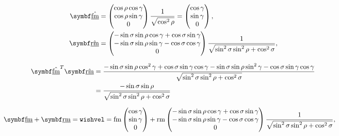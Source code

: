 \begin{align*}
\uvec{\flat{\fmove}} &=
\begin{pmatrix}
	\cos\rho\cos\gamma\\
	\cos\rho\sin\gamma\\
	0
\end{pmatrix} \frac{1}{\sqrt{\cos^2\rho}} =
\begin{pmatrix}
	\cos\gamma\\
	\sin\gamma\\
	0
\end{pmatrix},\\
\uvec{\flat{\rmove}} &=
\begin{pmatrix}
	-\sin\sigma\sin\rho\cos\gamma + \cos\sigma\sin\gamma\\
	-\sin\sigma\sin\rho\sin\gamma - \cos\sigma\cos\gamma\\
	0
\end{pmatrix} \frac{1}{\sqrt{\sin^2\sigma\sin^2\rho + \cos^2\sigma}},
\end{align*}

\begin{align*}
\uvec{\flat{\fmove}}^T \uvec{\flat{\rmove}} &= \frac{-\sin\sigma\sin\rho\cos^2\gamma + \cos\sigma\sin\gamma\cos\gamma - \sin\sigma\sin\rho\sin^2\gamma - \cos\sigma\sin\gamma\cos\gamma}{\sqrt{\sin^2\sigma\sin^2\rho + \cos^2\sigma}}\\
&= \frac{-\sin\sigma\sin\rho}{\sqrt{\sin^2\sigma\sin^2\rho + \cos^2\sigma}}
\end{align*}

\begin{align*}
\vec{\flat{\fmove}} + \vec{\flat{\rmove}} = \texttt{wishvel} &= \fmove
\begin{pmatrix}
	\cos\gamma\\
	\sin\gamma\\
	0
\end{pmatrix} + \rmove
\begin{pmatrix}
	-\sin\sigma\sin\rho\cos\gamma + \cos\sigma\sin\gamma\\
	-\sin\sigma\sin\rho\sin\gamma - \cos\sigma\cos\gamma\\
	0
\end{pmatrix} \frac{1}{\sqrt{\sin^2\sigma\sin^2\rho + \cos^2\sigma}},
\end{align*}

